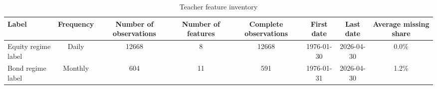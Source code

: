 \begin{table}
\caption{Teacher feature inventory}
\label{tab:app-teacher-feature-inventory}
\begin{tabular}{lccccccc}
\toprule
Label & Frequency & Number of observations & Number of features & Complete observations & First date & Last date & Average missing share \\
\midrule
Equity regime label & Daily & 12668 & 8 & 12668 & 1976-01-30 & 2026-04-30 & 0.0\% \\
Bond regime label & Monthly & 604 & 11 & 591 & 1976-01-31 & 2026-04-30 & 1.2\% \\
\bottomrule
\end{tabular}
\end{table}
